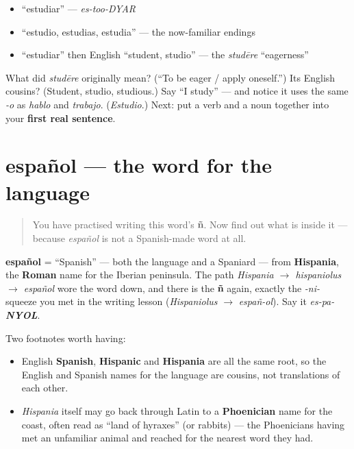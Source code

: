 \begin{itemize}
\raggedright
  \item \textquotedblleft{}estudiar\textquotedblright{} — \emph{es-too-DYAR}
  \item \textquotedblleft{}estudio, estudias, estudia\textquotedblright{} — the now-familiar endings
  \item \textquotedblleft{}estudiar\textquotedblright{} then English \textquotedblleft{}student, studio\textquotedblright{} — the \emph{studēre} \textquotedblleft{}eagerness\textquotedblright{}
\end{itemize}

\begin{tcolorbox}[breakable,colback=teal!4,colframe=teal!35!black,title={Before you move on}]
What did \emph{studēre} originally mean? (\textquotedblleft{}To be eager / apply oneself.\textquotedblright{}) Its English cousins? (Student, studio, studious.) Say \textquotedblleft{}I study\textquotedblright{} — and notice it uses the same \emph{-o} as \emph{hablo} and \emph{trabajo}. (\emph{Estudio}.) Next: put a verb and a noun together into your \textbf{first real sentence}.
\end{tcolorbox}
\section[español]{español — the word for the language}

\label{lesson:ES-C06-espanol}



\begin{quote}
You have practised writing this word's \textbf{ñ}. Now find out what is inside it — because \emph{español} is not a Spanish-made word at all.
\end{quote}

\begin{cousinweb}
\textbf{español} = \textquotedblleft{}Spanish\textquotedblright{} — both the language and a Spaniard — from \textbf{Hispania}, the \textbf{Roman} name for the Iberian peninsula. The path \emph{Hispania $\to$ hispaniolus $\to$ español} wore the word down, and there is the \textbf{ñ} again, exactly the \emph{-ni-} squeeze you met in the writing lesson (\emph{Hispaniolus} $\to$ \emph{españ-ol}). Say it \emph{es-pa-\textbf{NYOL}}.

Two footnotes worth having:

\begin{itemize}
\raggedright
  \item English \textbf{Spanish}, \textbf{Hispanic} and \textbf{Hispania} are all the same root, so the English and Spanish names for the language are cousins, not translations of each other.
  \item \emph{Hispania} itself may go back through Latin to a \textbf{Phoenician} name for the coast, often read as \textquotedblleft{}land of hyraxes\textquotedblright{} (or rabbits) — the Phoenicians having met an unfamiliar animal and reached for the nearest word they had.
\end{itemize}
\end{cousinweb}

